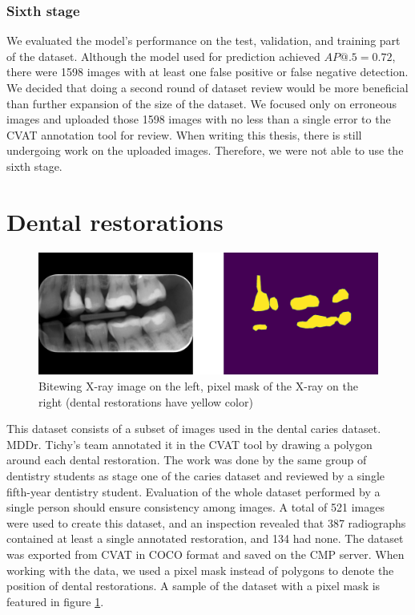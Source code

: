 \subsubsection{Sixth stage}
We evaluated the model's performance on the test, validation, and training part of the dataset. Although the model used for prediction achieved $AP@.5 = 0.72$, there were 1598 images with at least one false positive or false negative detection. We decided that doing a second round of dataset review would be more beneficial than further expansion of the size of the dataset. We focused only on erroneous images and uploaded those 1598 images with no  less than a single error to the CVAT annotation tool for review. When writing this thesis, there is still undergoing work on the uploaded images. Therefore, we were not able to use the sixth stage.


\section{Dental restorations}
\begin{figure}
    \centering
    \includegraphics[width=\linewidth]{images/segmentation_ds_sample.pdf}
    \caption{Bitewing X-ray image on the left, pixel mask of the X-ray on the right (dental restorations have yellow color)}
    \label{fig:segmentation_sample}
\end{figure}
This dataset consists of a subset of images used in the dental caries dataset. MDDr. Tichy's  team annotated it in the CVAT tool by drawing a polygon around each dental restoration. The work was done by the same group of dentistry students as stage one of the caries dataset and reviewed by a single fifth-year dentistry student. Evaluation of the whole dataset performed by a single person should ensure consistency among images. A total of 521 images were used to create this dataset, and an inspection revealed that 387 radiographs contained at least a single annotated restoration, and 134 had none.
The dataset was exported from CVAT in COCO format and saved on the CMP server. When working with the data, we used a pixel mask instead of polygons to denote the position of dental restorations. A sample of the dataset with a pixel mask is  featured in figure \ref{fig:segmentation_sample}.

